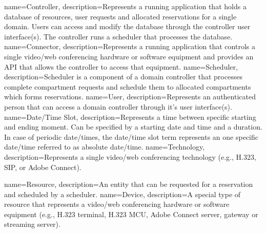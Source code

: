 %
%
{
  name=Controller,
  description={Represents a running application that holds a database of 
    resources, user requests and allocated reservations for a single 
    domain. Users can access and modify the database through the controller 
    user interface(s). The controller runs a scheduler that processes the 
    database.}
}
{
  name=Connector,
  description={Represents a running application that controls a single 
    video/web conferencing hardware or software equipment and provides an API 
    that allows the controller to access that equipment.}
}
{
  name=Scheduler,
  description={Scheduler is a component of a domain controller that processes 
    complete compartment requests and schedule them to allocated compartments 
    which forms reservations.}
}
{
  name=User,
  description={Represents an authenticated person that can access a domain 
    controller through it's user interface(s).}
}
{
  name=Date/Time Slot,
  description={Represents a time between specific starting and ending moment. 
    Can be specified by a starting date and time and a duration. In case of
    periodic date/times, the date/time slot term represents an one specific 
    date/time referred to as absolute date/time.}
}
{
  name=Technology,
  description={Represents a single video/web conferencing technology (e.g., 
    H.323, SIP, or Adobe Connect).}
}

%
%
{
  name=Resource,
  description={An entity that can be requested for a reservation and scheduled 
  by a scheduler.}
}
{
  name=Device,
  description={A special type of resource that represents a video/web 
    conferencing hardware or software equipment (e.g., H.323 terminal, H.323 
    MCU, Adobe Connect server, gateway or streaming server).}
}

